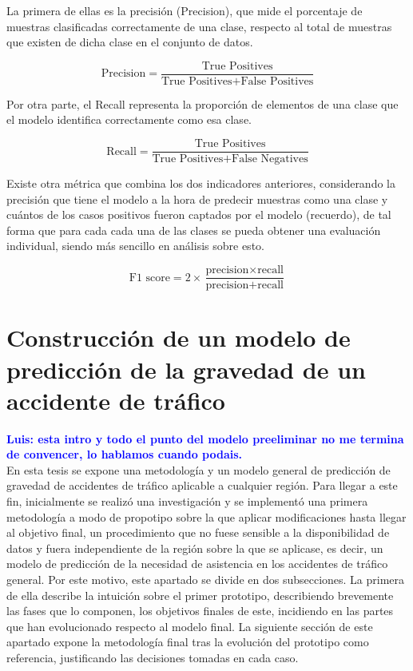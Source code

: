 \documentclass{uathesis-es}
\begin{document}
La primera de ellas es la precisión (Precision), que mide el porcentaje de muestras clasificadas correctamente de una clase, respecto al total de muestras que existen de dicha clase en el conjunto de datos.

$$\text{Precision} = \frac{{\text{True Positives}}}{{\text{True Positives} + \text{False Positives}}}$$

Por otra parte, el Recall representa la proporción de elementos de una clase que el modelo identifica correctamente como esa clase.

$$\text{Recall} = \frac{{\text{True Positives}}}{{\text{True Positives} + \text{False Negatives}}}$$

Existe otra métrica que combina los dos indicadores anteriores, considerando la precisión que tiene el modelo a la hora de predecir muestras como una clase y cuántos de los casos positivos fueron captados por el modelo (recuerdo), de tal forma que para cada cada una de las clases se pueda obtener una evaluación individual, siendo más sencillo en análisis sobre esto. 

$$\text{F1 score} = 2 \times \frac{{\text{precision} \times \text{recall}}}{{\text{precision} + \text{recall}}}$$

\chapter{Construcción de un modelo de predicción de la gravedad de un accidente de tráfico}

\textcolor{blue}{\textbf{Luis: esta intro y todo el punto del modelo preeliminar no me termina de convencer, lo hablamos cuando podais.}}\\


En esta tesis se expone una metodología y un modelo general de predicción de gravedad de accidentes de tráfico aplicable a cualquier región. Para llegar a este fin, inicialmente se realizó una investigación y se implementó una primera metodología a modo de propotipo sobre la que aplicar modificaciones hasta llegar al objetivo final, un procedimiento que no fuese sensible a la disponibilidad de datos y fuera independiente de la región sobre la que se aplicase, es decir, un modelo de predicción de la necesidad de asistencia en los accidentes de tráfico general. Por este motivo, este apartado se divide en dos subsecciones. La primera de ella describe la intuición sobre el primer prototipo, describiendo brevemente las fases que lo componen, los objetivos finales de este, incidiendo en las partes que han evolucionado respecto al modelo final. La siguiente sección de este apartado expone la metodología final tras la evolución del prototipo como referencia, justificando las decisiones tomadas en cada caso.
\end{document}
